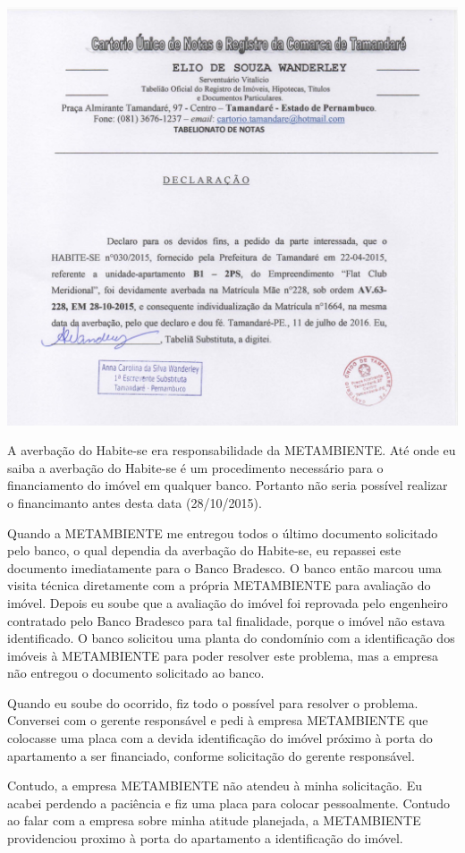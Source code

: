 \documentclass[11pt]{letter}
\begin{document}
\includegraphics[width=\textwidth]{doc.png}

A averbação do Habite-se era responsabilidade da METAMBIENTE. Até onde eu saiba a averbação do Habite-se é um procedimento necessário para o financiamento do imóvel em qualquer banco. Portanto não seria possível realizar o financimanto antes desta data (28/10/2015).

Quando a METAMBIENTE me entregou todos o último documento solicitado pelo banco, o qual dependia da averbação do Habite-se, eu repassei este documento imediatamente para o Banco Bradesco. O banco então marcou uma visita técnica diretamente com a própria METAMBIENTE para avaliação do imóvel. Depois eu soube que a avaliação do imóvel foi reprovada pelo engenheiro contratado pelo Banco Bradesco para tal finalidade, porque o imóvel não estava identificado. O banco solicitou uma planta do condomínio com a identificação dos imóveis à METAMBIENTE para poder resolver este problema, mas a empresa não entregou o documento solicitado ao banco. 

Quando eu soube do ocorrido, fiz todo o possível para resolver o problema. Conversei com o gerente responsável e pedi à empresa METAMBIENTE que colocasse uma placa com a devida identificação do imóvel próximo à porta do apartamento a ser financiado, conforme solicitação do gerente responsável. 

Contudo, a empresa METAMBIENTE não atendeu à minha solicitação. Eu acabei perdendo a paciência e fiz uma placa para colocar pessoalmente. Contudo ao falar com a empresa sobre minha atitude planejada, a METAMBIENTE providenciou proximo à porta do apartamento a identificação do imóvel. 
\end{document}
